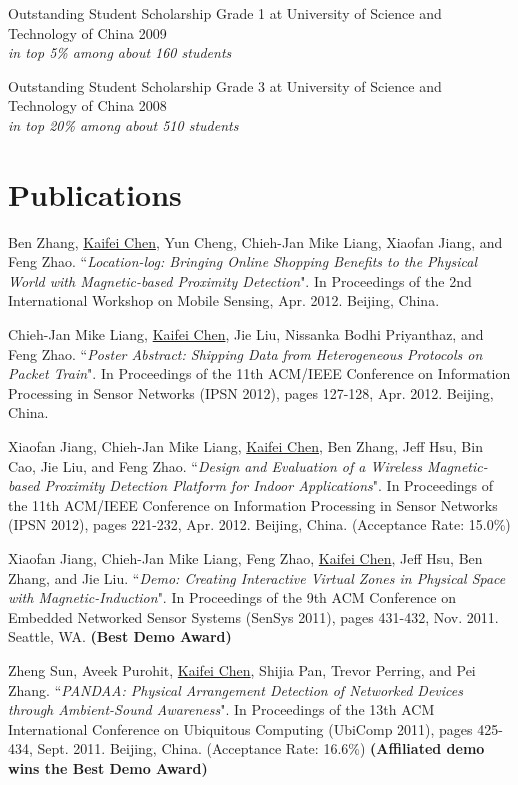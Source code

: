 \documentclass[margin,line]{res}
\begin{document}
\begin{resume}
      \vspace*{-2.5mm}
      Outstanding Student Scholarship Grade 1 at University of Science and Technology of China \hfill 2009\\
      {\it in top 5\% among about 160 students}

      \vspace*{-2.5mm}
      Outstanding Student Scholarship Grade 3 at University of Science and Technology of China \hfill 2008\\
      {\it in top 20\% among about 510 students}

    \section{\sc Publications}
      Ben Zhang, \underline{Kaifei Chen}, Yun Cheng, Chieh-Jan Mike Liang, Xiaofan Jiang, and Feng Zhao. ``{\it Location-log: Bringing Online Shopping Benefits to the Physical World with Magnetic-based Proximity Detection}". In Proceedings of the 2nd International Workshop on Mobile Sensing, Apr. 2012. Beijing, China.

      \vspace*{-2.0mm}
      Chieh-Jan Mike Liang, \underline{Kaifei Chen}, Jie Liu, Nissanka Bodhi Priyanthaz, and Feng Zhao. ``{\it Poster Abstract: Shipping Data from Heterogeneous Protocols on Packet Train}". In Proceedings of the 11th ACM/IEEE Conference on Information Processing in Sensor Networks (IPSN 2012), pages 127-128, Apr. 2012. Beijing, China.

      \vspace*{-2.0mm}
      Xiaofan Jiang, Chieh-Jan Mike Liang, \underline{Kaifei Chen}, Ben Zhang, Jeff Hsu, Bin Cao, Jie Liu, and Feng Zhao. ``{\it Design and Evaluation of a Wireless Magnetic-based Proximity Detection Platform for Indoor Applications}". In Proceedings of the 11th ACM/IEEE Conference on Information Processing in Sensor Networks (IPSN 2012), pages 221-232, Apr. 2012. Beijing, China. (Acceptance Rate: 15.0\%)

      \vspace*{-2.0mm}
      Xiaofan Jiang, Chieh-Jan Mike Liang, Feng Zhao, \underline{Kaifei Chen}, Jeff Hsu, Ben Zhang, and Jie Liu. ``{\it Demo: Creating Interactive Virtual Zones in Physical Space with Magnetic-Induction}". In Proceedings of the 9th ACM Conference on Embedded Networked Sensor Systems (SenSys 2011), pages 431-432, Nov. 2011. Seattle, WA. {\bf (Best Demo Award)}

      \vspace*{-2.0mm}
      Zheng Sun, Aveek Purohit, \underline{Kaifei Chen}, Shijia Pan, Trevor Perring, and Pei Zhang. ``{\it PANDAA: Physical Arrangement Detection of Networked Devices through Ambient-Sound Awareness}". In Proceedings of the 13th ACM International Conference on Ubiquitous Computing (UbiComp 2011), pages 425-434, Sept. 2011. Beijing, China. (Acceptance Rate: 16.6\%) {\bf (Affiliated demo wins the Best Demo Award)}


\end{resume}
\end{document}
